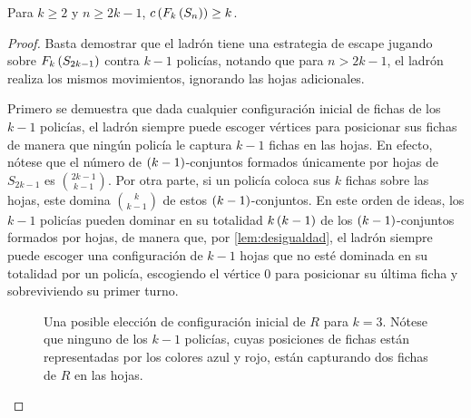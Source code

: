 \begin{teorema}
\label{teo:cota_estrella}
    Para $k\geq 2$ y $n\geq 2k-1$, $c\left( F_{k}\left( S_n\right)\right) \geq k$.
\end{teorema}


\begin{proof}
    Basta demostrar que el ladr\'on tiene una estrategia de escape jugando sobre
    $F_{k}\left( S_{2k-1}\right)$ contra $k-1$ polic\'ias, notando que para $n > 2k-1$, el
    ladr\'on realiza los mismos movimientos, ignorando las hojas adicionales.

    Primero se demuestra que dada cualquier configuraci\'on inicial de fichas de
    los $k-1$ polic\'ias, el ladr\'on siempre puede escoger v\'ertices para
    posicionar sus fichas de manera que ning\'un polic\'ia le captura $k-1$
    fichas en las hojas. En efecto, n\'otese que el n\'umero de
    $\left( k-1\right)$-conjuntos formados \'unicamente por hojas de $S_{2k-1}$ es
    $\binom{2k-1}{k-1}$. Por otra parte, si un polic\'ia coloca sus $k$ fichas
    sobre las hojas, este domina $\binom{k}{k-1}$ de estos
    $\left( k-1\right)$-conjuntos. En este orden de ideas, los $k-1$ polic\'ias pueden
    dominar en su totalidad $k\left( k-1\right)$ de los $\left( k-1\right)$-conjuntos
    formados por hojas, de manera que, por \cref{lem:desigualdad}, el ladr\'on
    siempre puede escoger una configuraci\'on de $k-1$ hojas que no est\'e
    dominada en su totalidad por un polic\'ia, escogiendo el v\'ertice $0$ para
    posicionar su \'ultima ficha y sobreviviendo su primer turno. 

    \begin{figure}[h]
        \centering
        \caption{Una posible elecci\'on de configuraci\'on inicial de $R$ para $k=3$. N\'otese que ninguno de los $k-1$ polic\'ias, cuyas posiciones de fichas est\'an representadas por los colores azul y rojo, est\'an capturando dos fichas de $R$ en las hojas.}
        \label{fig:Configuracion_inicial}
    \end{figure}


\end{proof}
